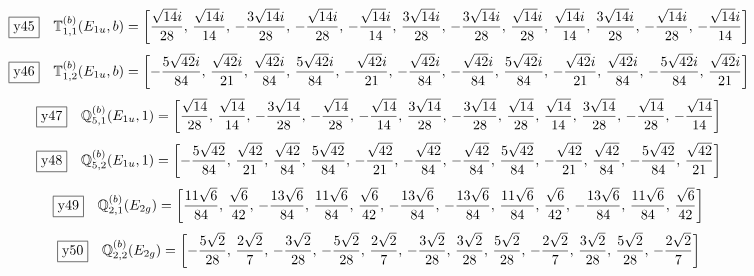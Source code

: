 \documentclass[fleqn,10pt,landscape]{jsarticle}
\begin{document}
\begin{dmath*}
\fbox{y45}\quad \mathbb{T}_{1,1}^{(b)}(E_{1u},b)=\left[ \frac{\sqrt{14} i}{28},\, \frac{\sqrt{14} i}{14},\, - \frac{3 \sqrt{14} i}{28},\, - \frac{\sqrt{14} i}{28},\, - \frac{\sqrt{14} i}{14},\, \frac{3 \sqrt{14} i}{28},\, - \frac{3 \sqrt{14} i}{28},\, \frac{\sqrt{14} i}{28},\, \frac{\sqrt{14} i}{14},\, \frac{3 \sqrt{14} i}{28},\, - \frac{\sqrt{14} i}{28},\, - \frac{\sqrt{14} i}{14} \right]
\end{dmath*}
\begin{dmath*}
\fbox{y46}\quad \mathbb{T}_{1,2}^{(b)}(E_{1u},b)=\left[ - \frac{5 \sqrt{42} i}{84},\, \frac{\sqrt{42} i}{21},\, \frac{\sqrt{42} i}{84},\, \frac{5 \sqrt{42} i}{84},\, - \frac{\sqrt{42} i}{21},\, - \frac{\sqrt{42} i}{84},\, - \frac{\sqrt{42} i}{84},\, \frac{5 \sqrt{42} i}{84},\, - \frac{\sqrt{42} i}{21},\, \frac{\sqrt{42} i}{84},\, - \frac{5 \sqrt{42} i}{84},\, \frac{\sqrt{42} i}{21} \right]
\end{dmath*}
\begin{dmath*}
\fbox{y47}\quad \mathbb{Q}_{5,1}^{(b)}(E_{1u},1)=\left[ \frac{\sqrt{14}}{28},\, \frac{\sqrt{14}}{14},\, - \frac{3 \sqrt{14}}{28},\, - \frac{\sqrt{14}}{28},\, - \frac{\sqrt{14}}{14},\, \frac{3 \sqrt{14}}{28},\, - \frac{3 \sqrt{14}}{28},\, \frac{\sqrt{14}}{28},\, \frac{\sqrt{14}}{14},\, \frac{3 \sqrt{14}}{28},\, - \frac{\sqrt{14}}{28},\, - \frac{\sqrt{14}}{14} \right]
\end{dmath*}
\begin{dmath*}
\fbox{y48}\quad \mathbb{Q}_{5,2}^{(b)}(E_{1u},1)=\left[ - \frac{5 \sqrt{42}}{84},\, \frac{\sqrt{42}}{21},\, \frac{\sqrt{42}}{84},\, \frac{5 \sqrt{42}}{84},\, - \frac{\sqrt{42}}{21},\, - \frac{\sqrt{42}}{84},\, - \frac{\sqrt{42}}{84},\, \frac{5 \sqrt{42}}{84},\, - \frac{\sqrt{42}}{21},\, \frac{\sqrt{42}}{84},\, - \frac{5 \sqrt{42}}{84},\, \frac{\sqrt{42}}{21} \right]
\end{dmath*}
\begin{dmath*}
\fbox{y49}\quad \mathbb{Q}_{2,1}^{(b)}(E_{2g})=\left[ \frac{11 \sqrt{6}}{84},\, \frac{\sqrt{6}}{42},\, - \frac{13 \sqrt{6}}{84},\, \frac{11 \sqrt{6}}{84},\, \frac{\sqrt{6}}{42},\, - \frac{13 \sqrt{6}}{84},\, - \frac{13 \sqrt{6}}{84},\, \frac{11 \sqrt{6}}{84},\, \frac{\sqrt{6}}{42},\, - \frac{13 \sqrt{6}}{84},\, \frac{11 \sqrt{6}}{84},\, \frac{\sqrt{6}}{42} \right]
\end{dmath*}
\begin{dmath*}
\fbox{y50}\quad \mathbb{Q}_{2,2}^{(b)}(E_{2g})=\left[ - \frac{5 \sqrt{2}}{28},\, \frac{2 \sqrt{2}}{7},\, - \frac{3 \sqrt{2}}{28},\, - \frac{5 \sqrt{2}}{28},\, \frac{2 \sqrt{2}}{7},\, - \frac{3 \sqrt{2}}{28},\, \frac{3 \sqrt{2}}{28},\, \frac{5 \sqrt{2}}{28},\, - \frac{2 \sqrt{2}}{7},\, \frac{3 \sqrt{2}}{28},\, \frac{5 \sqrt{2}}{28},\, - \frac{2 \sqrt{2}}{7} \right]
\end{dmath*}
\end{document}
